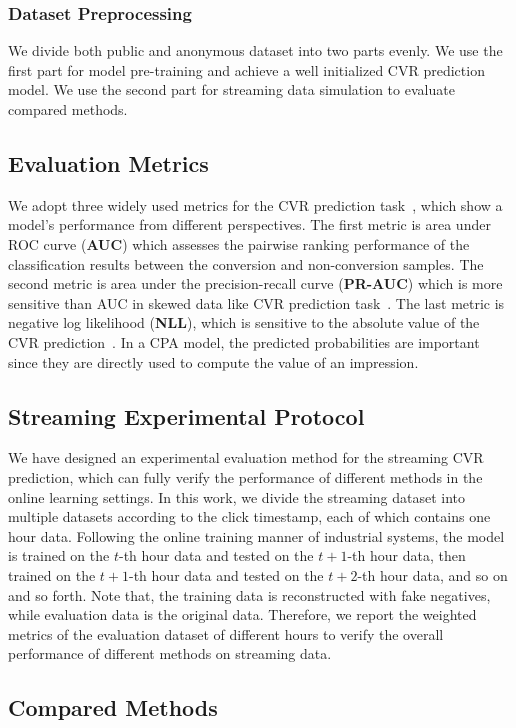 \documentclass[letterpaper]{article}
\begin{document}
\subsubsection{Dataset Preprocessing}
We divide both public and anonymous dataset into two parts evenly. We use the first part for model pre-training and achieve a well initialized CVR prediction model. We use the second part for streaming data simulation to evaluate compared methods.

\subsection{Evaluation Metrics}
We adopt three widely used metrics for the CVR prediction task~\cite{ni2018perceive,zhou2019deep,FNW,FSIW}, which show a model's performance from different perspectives. The first metric is area under ROC curve (\textbf{AUC}) which assesses the pairwise ranking performance of the classification results between the conversion and non-conversion samples. The second metric is area under the precision-recall curve (\textbf{PR-AUC}) which is more sensitive than AUC in skewed data like CVR prediction task~\cite{FSIW}. The last metric is negative log likelihood (\textbf{NLL}), which is sensitive to the absolute value of the CVR prediction~\cite{DFM}. In a CPA model, the predicted probabilities are important since they are directly used to compute the value of an impression.

\subsection{Streaming Experimental Protocol}
We have designed an experimental evaluation method for the streaming CVR prediction, which can fully verify the performance of different methods in the online learning settings. In this work, we divide the streaming dataset into multiple datasets according to the click timestamp, each of which contains one hour data. Following the online training manner of industrial systems, the model is trained on the $t$-th hour data and tested on the $t+1$-th hour data, then trained on the $t+1$-th hour data and tested on the $t+2$-th hour data, and so on and so forth. Note that, the training data is reconstructed with fake negatives, while evaluation data is the original data. Therefore, we report the weighted metrics of the evaluation dataset of different hours to verify the overall performance of different methods on streaming data.

\subsection{Compared Methods}
\end{document}
